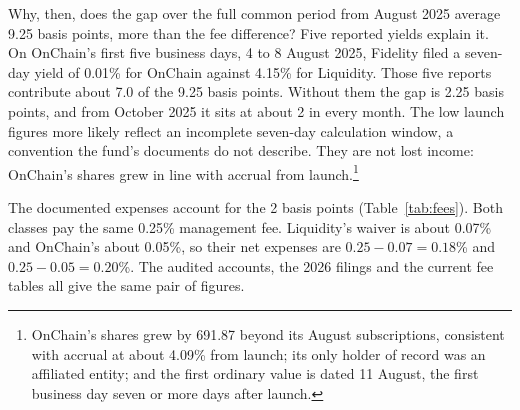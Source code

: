 \documentclass[12pt,a4paper]{article}
\begin{document}
Why, then, does the gap over the full common period from August 2025 average 9.25 basis points, more than the fee difference? Five reported yields explain it. On OnChain's first five business days, 4 to 8 August 2025, Fidelity filed a seven-day yield of 0.01\% for OnChain against 4.15\% for Liquidity. Those five reports contribute about 7.0 of the 9.25 basis points. Without them the gap is 2.25 basis points, and from October 2025 it sits at about 2 in every month. The low launch figures more likely reflect an incomplete seven-day calculation window, a convention the fund's documents do not describe. They are not lost income: OnChain's shares grew in line with accrual from launch.\footnote{OnChain's shares grew by 691.87 beyond its August subscriptions, consistent with accrual at about 4.09\% from launch; its only holder of record was an affiliated entity; and the first ordinary value is dated 11 August, the first business day seven or more days after launch.}

The documented expenses account for the 2 basis points (Table~\ref{tab:fees}). Both classes pay the same 0.25\% management fee. Liquidity's waiver is about 0.07\% and OnChain's about 0.05\%, so their net expenses are \mbox{$0.25 - 0.07 = 0.18$\%} and \mbox{$0.25 - 0.05 = 0.20$\%}. The audited accounts, the 2026 filings and the current fee tables all give the same pair of figures.
\end{document}
